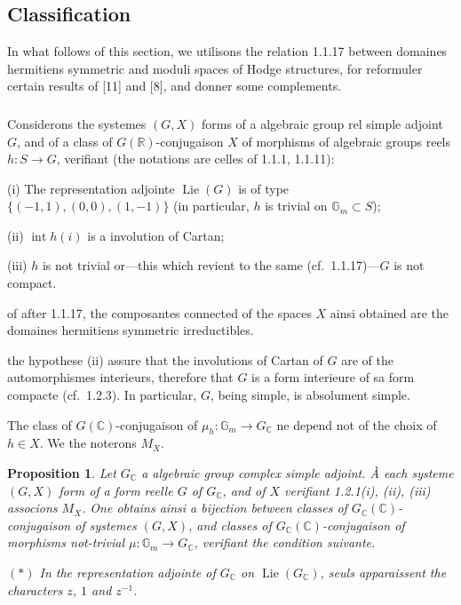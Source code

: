 \documentclass[12pt,a4paper]{article}
\theoremstyle{plain}
\newtheorem{proposition}[theorem]{Proposition}
\theoremstyle{definition}
\theoremstyle{remark}
\DeclareMathOperator{\Lie}{Lie}
\DeclareMathOperator{\Int}{int}
\newcommand{\RR}{\mathbb{R}}
\newcommand{\CC}{\mathbb{C}}
\newcommand{\Gm}{\mathbb{G}}
\begin{document}
\subsection{Classification}

In what follows of this section, we utilisons the relation 1.1.17 between domaines hermitiens symmetric and moduli spaces of Hodge structures, for reformuler certain results of [11] and [8], and donner some complements.

\subsubsection{}

Considerons the systemes $(G,X)$ forms of a algebraic group rel simple adjoint $G$, and of a class of $G(\RR)$-conjugaison $X$ of morphisms of algebraic groups reels $h:S \to G$, verifiant (the notations are celles of 1.1.1, 1.1.11):

(i) The representation adjointe $\Lie(G)$ is of type $\{(-1,1),(0,0),(1,-1)\}$ (in particular, $h$ is trivial on $\Gm_m \subset S$);

(ii) $\Int h(i)$ is a involution of Cartan;

(iii) $h$ is not trivial or---this which revient to the same (cf.~1.1.17)---$G$ is not compact.

of after 1.1.17, the composantes connected of the spaces $X$ ainsi obtained are the domaines hermitiens symmetric irreductibles.

the hypothese (ii) assure that the involutions of Cartan of $G$ are of the automorphismes interieurs, therefore that $G$ is a form interieure of sa form compacte (cf.~1.2.3). In particular, $G$, being simple, is absolument simple.

The class of $G(\CC)$-conjugaison of $\mu_h:\Gm_m \to G_{\CC}$ ne depend not of the choix of $h \in X$. We the noterons $M_X$.

\begin{proposition}
Let $G_{\CC}$ a algebraic group complex simple adjoint. \`A each systeme $(G,X)$ form of a form reelle $G$ of $G_{\CC}$, and of $X$ verifiant \textup{1.2.1(i), (ii), (iii)} associons $M_X$. One obtains ainsi a bijection between classes of $G_{\CC}(\CC)$-conjugaison of systemes $(G,X)$, and classes of $G_{\CC}(\CC)$-conjugaison of morphisms not-trivial $\mu:\Gm_m \to G_{\CC}$, verifiant the condition suivante.

$(*)$ In the representation adjointe of $G_{\CC}$ on $\Lie(G_{\CC})$, seuls apparaissent the characters $z$, $1$ and $z^{-1}$.
\end{proposition}
\end{document}
